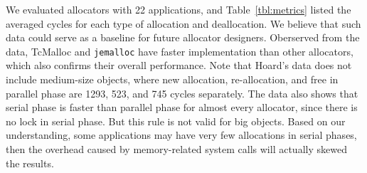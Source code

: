 \begin{table}[htbp]
  \centering
  \caption{Average cycles of allocation/deallocation operation of different allocators\label{tbl:metrics}}
\end{table}

We evaluated allocators with 22 applications, and Table~\ref{tbl:metrics} listed the averaged cycles for each type of allocation and deallocation. We believe that such data could serve as a baseline for future allocator designers. Oberserved from the data, TcMalloc and \texttt{jemalloc} have faster implementation than other allocators, which also confirms their overall performance. Note that Hoard's data does not include medium-size objects, where new allocation, re-allocation, and free in parallel phase are 1293, 523, and 745 cycles separately. The data also shows that serial phase is faster than parallel phase for almost every allocator, since there is no lock in serial phase. But this rule is not valid for big objects. Based on our understanding, some applications may have very few allocations in serial phases, then the overhead caused by memory-related system calls will actually skewed the results.     



